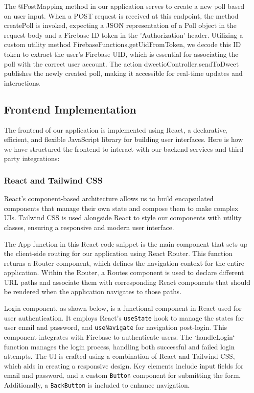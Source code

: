 The @PostMapping method in our application serves to create a new poll based on user input. When a POST request is received at this endpoint, the method createPoll is invoked, expecting a JSON representation of a Poll object in the request body and a Firebase ID token in the 'Authorization' header. Utilizing a custom utility method FirebaseFunctions.getUidFromToken, we decode this ID token to extract the user's Firebase UID, which is essential for associating the poll with the correct user account. The action dweetioController.sendToDweet publishes the newly created poll, making it accessible for real-time updates and interactions.



\subsection{Frontend Implementation}
The frontend of our application is implemented using React, a declarative, efficient, and flexible JavaScript library for building user interfaces. Here is how we have structured the frontend to interact with our backend services and third-party integrations:

\subsubsection*{React and Tailwind CSS}
React’s component-based architecture allows us to build encapsulated components that manage their own state and compose them to make complex UIs. Tailwind CSS is used alongside React to style our components with utility classes, ensuring a responsive and modern user interface.

The App function in this React code snippet is the main component that sets up the client-side routing for our application using React Router. This function returns a Router component, which defines the navigation context for the entire application. Within the Router, a Routes component is used to declare different URL paths and associate them with corresponding React components that should be rendered when the application navigates to those paths.



Login component, as shown below, is a functional component in React used for user authentication. It employs React's \texttt{useState} hook to manage the states for user email and password, and \texttt{useNavigate} for navigation post-login. This component integrates with Firebase to authenticate users. The `handleLogin` function manages the login process, handling both successful and failed login attempts. The UI is crafted using a combination of React and Tailwind CSS, which aids in creating a responsive design. Key elements include input fields for email and password, and a custom \texttt{Button} component for submitting the form. Additionally, a \texttt{BackButton} is included to enhance navigation.

